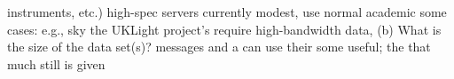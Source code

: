 \documentclass[times]{cpeauth}
\begin{document}
%
instruments, etc.)
%
high-spec servers %
currently modest, %
use normal academic %
some cases: e.g., sky %
the UKLight project's %
require high-bandwidth %
%
data, (b) What is the size of the data set(s)?
%
messages %
and a %
can use %
their %
%
%
%
%
some %
useful; the %
that much %
still %
is %
given %
\end{document}
